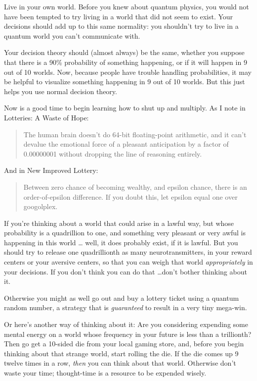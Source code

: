 {
 Live in your own world. Before you knew about quantum physics, you
would not have been tempted to try living in a world that did not seem
to exist. Your decisions should add up to this same normality: you
shouldn't try to live in a quantum world you
can't communicate with.}

{
 Your decision theory should (almost always) be the same, whether
you suppose that there is a 90\% probability of something happening, or
if it will happen in 9 out of 10 worlds. Now, because people have
trouble handling probabilities, it may be helpful to visualize
something happening in 9 out of 10 worlds. But this just helps you use
normal decision theory.}

{
 Now is a good time to begin learning how to shut up and multiply.
As I note in Lotteries: A Waste of Hope:}

\begin{quote}
{
 The human brain doesn't do 64-bit floating-point
arithmetic, and it can't devalue the emotional force of
a pleasant anticipation by a factor of 0.00000001 without dropping the
line of reasoning entirely.}
\end{quote}

{
 And in New Improved Lottery:}

\begin{quote}
{
 Between zero chance of becoming wealthy, and epsilon chance, there
is an order-of-epsilon difference. If you doubt this, let epsilon equal
one over googolplex.}
\end{quote}

{
 If you're thinking about a world that could arise
in a lawful way, but whose probability is a quadrillion to one, and
something very pleasant or very awful is happening in this world \ldots
well, it does probably exist, if it is lawful. But you should try to
release one quadrillionth as many neurotransmitters, in your reward
centers or your aversive centers, so that you can weigh that world
\textit{appropriately} in your decisions. If you don't
think you can do that \ldots don't bother thinking about
it.}

{
 Otherwise you might as well go out and buy a lottery ticket using
a quantum random number, a strategy that is \textit{guaranteed} to
result in a very tiny mega-win.}

{
 Or here's another way of thinking about it: Are
you considering expending some mental energy on a world whose frequency
in your future is less than a trillionth? Then go get a 10-sided die
from your local gaming store, and, before you begin thinking about that
strange world, start rolling the die. If the die comes up 9 twelve
times in a row, \textit{then} you can think about that world. Otherwise
don't waste your time; thought-time is a resource to be
expended wisely.}

